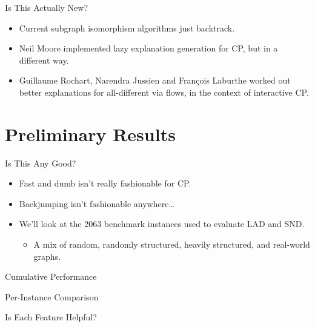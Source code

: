 \documentclass{beamer}
\begin{document}
\begin{frame}{Is This Actually New?}
    \begin{itemize}
        \item Current subgraph isomorphism algorithms just backtrack.

        \item Neil Moore implemented lazy explanation generation for CP, but in a different way.

        \item Guillaume Rochart, Narendra Jussien and François Laburthe worked out better
            explanations for all-different via flows, in the context of interactive CP.
    \end{itemize}
\end{frame}

\section{Preliminary Results}

\frame{\sectionpage}

\begin{frame}{Is This Any Good?}
    \begin{itemize}
        \item Fast and dumb isn't really fashionable for CP.

        \item Backjumping isn't fashionable anywhere\ldots

        \item We'll look at the 2063 benchmark instances used to evaluate LAD and SND.
            \begin{itemize}
                \item A mix of random, randomly structured, heavily structured, and real-world
                    graphs.
            \end{itemize}
    \end{itemize}
\end{frame}

\begin{frame}{Cumulative Performance}
    
\end{frame}

\begin{frame}{Per-Instance Comparison}
    
\end{frame}

\begin{frame}{Is Each Feature Helpful?}
    
\end{frame}
\end{document}
